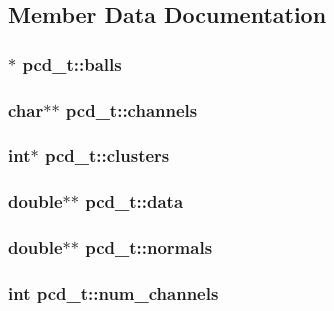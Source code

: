 \subsection{Member Data Documentation}
\hypertarget{structpcd__t_acad9401b583e1d3cf16a74a702f83fba}{
\subsubsection[{balls}]{$\ast$ {\bf pcd\_\-t::balls}}}
\label{structpcd__t_acad9401b583e1d3cf16a74a702f83fba}
\hypertarget{structpcd__t_aadf41ef08c5e8925944bfe775fc39483}{
\subsubsection[{channels}]{\setlength{\rightskip}{0pt plus 5cm}char$\ast$$\ast$ {\bf pcd\_\-t::channels}}}
\label{structpcd__t_aadf41ef08c5e8925944bfe775fc39483}
\hypertarget{structpcd__t_aed7402283df4a6d4788f58941064e10a}{
\subsubsection[{clusters}]{\setlength{\rightskip}{0pt plus 5cm}int$\ast$ {\bf pcd\_\-t::clusters}}}
\label{structpcd__t_aed7402283df4a6d4788f58941064e10a}
\hypertarget{structpcd__t_aee8b2a44e95e26f441ed753c476d4a35}{
\subsubsection[{data}]{\setlength{\rightskip}{0pt plus 5cm}double$\ast$$\ast$ {\bf pcd\_\-t::data}}}
\label{structpcd__t_aee8b2a44e95e26f441ed753c476d4a35}
\hypertarget{structpcd__t_ad47f9f4b1afe3dc4a64a24d98c73b48f}{
\subsubsection[{normals}]{\setlength{\rightskip}{0pt plus 5cm}double$\ast$$\ast$ {\bf pcd\_\-t::normals}}}
\label{structpcd__t_ad47f9f4b1afe3dc4a64a24d98c73b48f}
\hypertarget{structpcd__t_a85bedd808d9e6e291242d4d77fb2f969}{
\subsubsection[{num\_\-channels}]{\setlength{\rightskip}{0pt plus 5cm}int {\bf pcd\_\-t::num\_\-channels}}}
